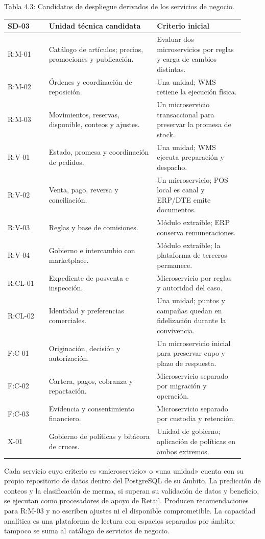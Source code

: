 \documentclass[11pt]{article}
\begin{document}
Tabla 4.3: Candidatos de despliegue derivados de los servicios de negocio.\par\nopagebreak
\begin{longtable}{@{}p{0.16\linewidth}p{0.42\linewidth}p{0.34\linewidth}@{}}
\toprule SD-03 & Unidad técnica candidata & Criterio inicial \\
\midrule\endhead\bottomrule\endlastfoot
R:M-01 & Catálogo de artículos; precios, promociones y publicación. & Evaluar dos microservicios por reglas y carga de cambios distintas. \\
R:M-02 & Órdenes y coordinación de reposición. & Una unidad; WMS retiene la ejecución física. \\
R:M-03 & Movimientos, reservas, disponible, conteos y ajustes. & Un microservicio transaccional para preservar la promesa de stock. \\
R:V-01 & Estado, promesa y coordinación de pedidos. & Una unidad; WMS ejecuta preparación y despacho. \\
R:V-02 & Venta, pago, reversa y conciliación. & Un microservicio; POS local es canal y ERP/DTE emite documentos. \\
R:V-03 & Reglas y base de comisiones. & Módulo extraíble; ERP conserva remuneraciones. \\
R:V-04 & Gobierno e intercambio con marketplace. & Módulo extraíble; la plataforma de terceros permanece. \\
R:CL-01 & Expediente de posventa e inspección. & Microservicio por reglas y autoridad del caso. \\
R:CL-02 & Identidad y preferencias comerciales. & Una unidad; puntos y campañas quedan en fidelización durante la convivencia. \\
F:C-01 & Originación, decisión y autorización. & Un microservicio inicial para preservar cupo y plazo de respuesta. \\
F:C-02 & Cartera, pagos, cobranza y repactación. & Microservicio separado por migración y operación. \\
F:C-03 & Evidencia y consentimiento financiero. & Microservicio separado por custodia y retención. \\
X-01 & Gobierno de políticas y bitácora de cruces. & Unidad de gobierno; aplicación de políticas en ambos extremos. \\
\end{longtable}

Cada servicio cuyo criterio es «microservicio» o «una unidad» cuenta con su propio repositorio de datos dentro del PostgreSQL de su ámbito. La predicción de conteos y la clasificación de merma, si superan su validación de datos y beneficio, se ejecutan como procesadores de apoyo de Retail. Producen recomendaciones para R:M-03 y no escriben ajustes ni el disponible comprometible. La capacidad analítica es una plataforma de lectura con espacios separados por ámbito; tampoco se suma al catálogo de servicios de negocio.
\end{document}

